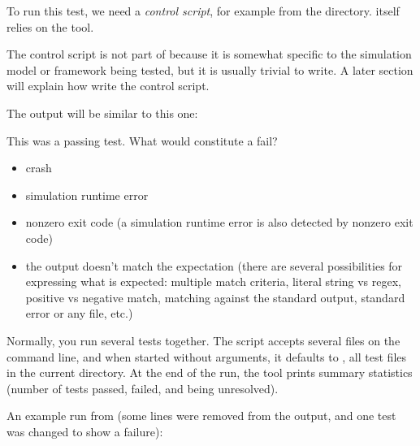 To run this test, we need a \textit{control script}, for example
 from the  directory. 
itself relies on the  tool.

\begin{note}
The control script is not part of {\opp} because it is somewhat specific to
the simulation model or framework being tested, but it is usually trivial
to write. A later section will explain how write the control script.
\end{note}

The output will be similar to this one:


This was a passing test. What would constitute a fail?

\begin{itemize}
\item crash
\item simulation runtime error
\item nonzero exit code (a simulation runtime error is also detected by nonzero exit code)
\item the output doesn't match the expectation (there are several possibilities
   for expressing what is expected: multiple match criteria, literal string vs regex,
   positive vs negative match, matching against the standard output, standard error
   or any file, etc.)
\end{itemize}

Normally, you run several tests together. The  script accepts
several  files on the command line, and when started without
arguments, it defaults to , all test files in the current
directory. At the end of the run, the tool prints summary statistics
(number of tests passed, failed, and being unresolved).

An example run from  (some lines were removed from
the output, and one test was changed to show a failure):

